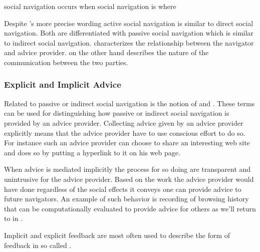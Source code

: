 \begin{items}
   social navigation occurs when
   social navigation is where
\end{items}

Despite \citeauthor{svensson03}'s more precise wording active social
navigation is similar to direct social navigation. Both are differentiated
with passive social navigation which is similar to indirect social navigation.
\citeauthor{dieberger97} characterizes the relationship between the
navigator and advice provider. \citeauthor{svensson03} on the other hand
describes the nature of the communication between the two parties.

\subsubsection{Explicit and Implicit Advice}

Related to passive or indirect social navigation is the notion
of  and .
These terms can be used for distinguishing how
passive or indirect social navigation is provided by an advice provider.
Collecting advice given by an advice provider explicitly means that
the advice provider have to use conscious effort to do so. For instance such
an advice provider can choose to share an interesting web site and does so by
putting a hyperlink to it on his web page.

When advice is mediated implicitly the process for so doing are transparent
and unintrusive for the advice provider. Based on the work the advice provider
would have done regardless of the social effects it conveys one can provide
advice to future navigators. An example of such behavior is recording of
browsing history that can be computationally evaluated to provide advice for
others as we'll return to in
.

Implicit and explicit feedback are most often used to
describe the form of feedback in so called %
\citep[p.~82]{oard98}.


